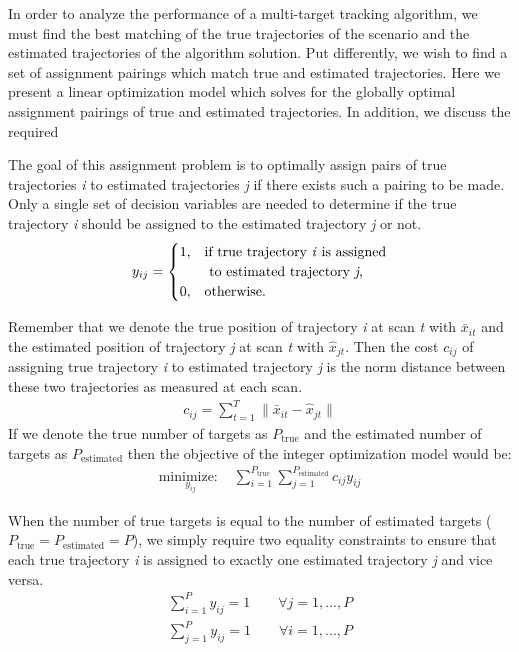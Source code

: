 In order to analyze the performance of a multi-target tracking algorithm, we must find the best matching of the true trajectories of the scenario and the estimated trajectories of the algorithm solution. Put differently, we wish to find a set of assignment pairings which match true and estimated trajectories. Here we present a linear optimization model which solves for the globally optimal assignment pairings of true and estimated trajectories. In addition, we discuss the required 

The goal of this assignment problem is to optimally assign pairs of true trajectories \textit{i} to estimated trajectories \textit{j} if there exists such a pairing to be made. Only a single set of decision variables are needed to determine if the true trajectory \textit{i} should be assigned to the estimated trajectory \textit{j} or not. 
\[y_{ij} = 
\begin{cases}
1, & \text{if true trajectory \textit{i} is assigned}\\
    & \text{ to estimated trajectory \textit{j},}\\
0, & \text{otherwise.}
\end{cases}\]

Remember that we denote the true position of trajectory \textit{i} at scan \textit{t} with $\bar{x}_{it}$ and the estimated position of trajectory \textit{j} at scan \textit{t} with $\hat{x}_{jt}$. Then the cost $c_{ij}$ of assigning true trajectory \textit{i} to estimated trajectory \textit{j} is the norm distance between these two trajectories as measured at each scan. 
\begin{align*}
	c_{ij} = \sum_{t=1}^{T} \|\bar{x}_{it} - \hat{x}_{jt}\|
\end{align*}
If we denote the true number of targets as $P_{\text{true}}$ and the estimated number of targets as $P_{\text{estimated}}$ then the objective of the integer optimization model would be:
\begin{align*}
\underset{y_{ij}}{\text{minimize: }} & \sum_{i=1}^{P_{\text{true}}} \sum_{j=1}^{P_{\text{estimated}}} c_{ij}y_{ij}
\end{align*}

When the number of true targets is equal to the number of estimated targets ($P_{\text{true}} = P_{\text{estimated}} = P$), we simply require two equality constraints to ensure that each true trajectory \textit{i} is assigned to exactly one estimated trajectory \textit{j} and vice versa. 
\begin{align}\label{eqn:assignment_1}
\sum_{i=1}^{P} y_{ij} = 1 \qquad \forall j = 1,...,P
\end{align}
\begin{align}\label{eqn:assignment_2}
\sum_{j=1}^{P} y_{ij} = 1 \qquad \forall i = 1,...,P
\end{align}

